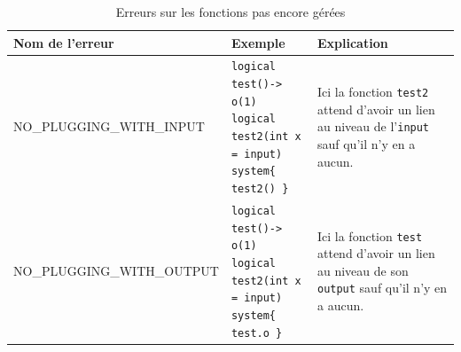 \documentclass[a4paper, 11pt]{article}
\newcommand{\prog}[1]{\texttt{#1}}
\begin{document}
\begin{appendix}
\begin{table}
    \centering
    \begin{tabular}{|l|l|p{5cm}|}
    \hline
        Nom de l'erreur & Exemple & Explication  \\
        \hline
         NO\_PLUGGING\_WITH\_INPUT & \makecell{\prog{logical test()-> o(1)} \\ \prog{logical test2(int x = input)} \\ \prog{system\{ test2() \}}} & Ici la fonction \prog{test2} attend d'avoir un lien au niveau de l'\prog{input} sauf qu'il n'y en a aucun. \\
         \hline
         NO\_PLUGGING\_WITH\_OUTPUT & \makecell{\prog{logical test()-> o(1)} \\ \prog{logical test2(int x = input)} \\ \prog{system\{ test.o \}}} & Ici la fonction \prog{test} attend d'avoir un lien au niveau de son \prog{output} sauf qu'il n'y en a aucun. \\
         \hline
    \end{tabular}
    \caption{Erreurs sur les fonctions pas encore gérées}
    \label{tab:erreur_fonction_non_geree}
\end{table}

\end{appendix}
\end{document}
